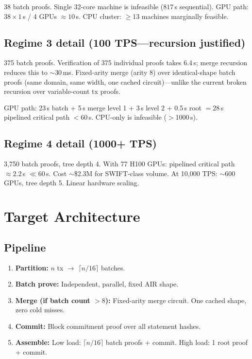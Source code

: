 \documentclass[11pt]{article}
\begin{document}
38 batch proofs. Single 32-core machine is infeasible ($817$\,s sequential).
GPU path: $38 \times 1$\,s / 4 GPUs $\approx 10$\,s. CPU cluster:
$\ge$13 machines marginally feasible.

\subsection{Regime 3 detail (100 TPS---recursion justified)}

375 batch proofs. Verification of 375 individual proofs takes 6.4\,s;
merge recursion reduces this to $\sim$30\,ms. Fixed-arity merge (arity 8)
over identical-shape batch proofs (same domain, same width, one cached
circuit)---unlike the current broken recursion over variable-count tx proofs.

GPU path: 23\,s batch + 5\,s merge level 1 + 3\,s level 2 + 0.5\,s root
$= 28$\,s pipelined critical path $< 60$\,s.
CPU-only is infeasible ($>$1000\,s).

\subsection{Regime 4 detail (1000+ TPS)}

3{,}750 batch proofs, tree depth 4. With 77 H100 GPUs: pipelined critical
path $\approx 2.2$\,s $\ll 60$\,s. Cost $\sim$\$2.3M for SWIFT-class volume.
At 10{,}000 TPS: $\sim$600 GPUs, tree depth 5. Linear hardware scaling.

\section{Target Architecture}

\subsection{Pipeline}

\begin{enumerate}[leftmargin=2em]
  \item \textbf{Partition:} $n$ tx $\to$ $\lceil n/16 \rceil$ batches.
  \item \textbf{Batch prove:} Independent, parallel, fixed AIR shape.
  \item \textbf{Merge (if batch count $> 8$):} Fixed-arity merge circuit.
        One cached shape, zero cold misses.
  \item \textbf{Commit:} Block commitment proof over all statement hashes.
  \item \textbf{Assemble:} Low load: $\lceil n/16 \rceil$ batch proofs +
        commit. High load: 1 root proof + commit.
\end{enumerate}
\end{document}
